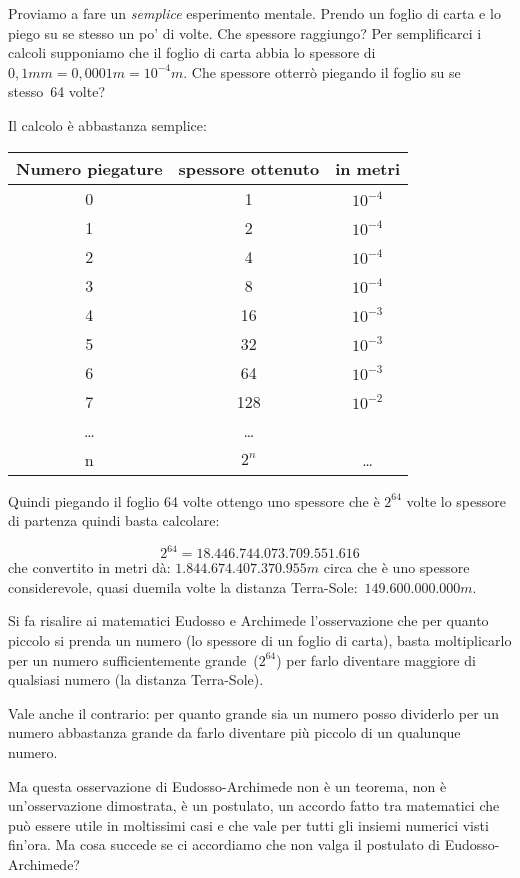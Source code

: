 Proviamo a fare un \emph{semplice} esperimento mentale. Prendo un foglio di 
carta e lo piego su se stesso un po' di volte. Che spessore raggiungo?
Per semplificarci i calcoli supponiamo che il foglio di carta abbia lo spessore 
di $0,1mm = 0,0001m = 10^{-4}m$. 
Che spessore otterrò piegando il foglio su se stesso~64 volte?

Il calcolo è abbastanza semplice:

\begin{center}
 \begin{tabular}{ccc}
\toprule
Numero piegature & spessore ottenuto & in metri\\
\midrule
0 & 1 & $10^{-4}$\\
1 & 2 & $10^{-4}$\\
2 & 4 & $10^{-4}$\\
3 & 8 & $10^{-4}$\\
4 & 16 & $10^{-3}$\\
5 & 32 & $10^{-3}$\\
6 & 64 & $10^{-3}$\\
7 & 128 & $10^{-2}$\\
\ldots& \ldots\\
n & $2^n$ & \ldots\\
\bottomrule
\end{tabular}
\end{center}

Quindi piegando il foglio 64 volte ottengo uno spessore che è $2^{64}$ volte lo 
spessore di partenza quindi basta calcolare:

\[2^{64} = 18.446.744.073.709.551.616\]
che convertito in metri dà: $1.844.674.407.370.955m$ circa che è uno spessore 
considerevole, quasi duemila volte la distanza Terra-Sole:~$149.600.000.000m$.

Si fa risalire ai matematici Eudosso e Archimede l'osservazione che per quanto 
piccolo si prenda un numero (lo spessore di un foglio di carta), basta 
moltiplicarlo per un numero sufficientemente grande~($2^{64}$) per farlo 
diventare maggiore di qualsiasi numero (la distanza Terra-Sole).

Vale anche il contrario: per quanto grande sia un numero posso dividerlo per un 
numero abbastanza grande da farlo diventare più piccolo di un qualunque numero.

Ma questa osservazione di Eudosso-Archimede non è un teorema, non è 
un'osservazione dimostrata, è un postulato, un accordo fatto tra matematici che 
può essere utile in moltissimi casi e che vale per tutti gli insiemi numerici 
visti fin'ora. Ma cosa succede se ci accordiamo che non valga il postulato di 
Eudosso-Archimede?

